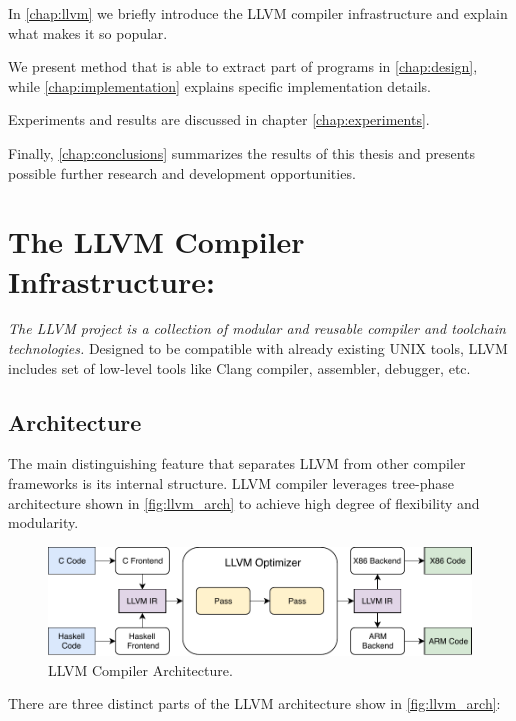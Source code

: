 \documentclass[12pt, twoside]{fithesis2}
\renewcommand{\_}{\leavevmode \kern0.07em\vbox{\hrule width0.4em}}
\begin{document}
In \autoref{chap:llvm} we briefly introduce the LLVM compiler
infrastructure and explain what makes it so popular.

We present method that is able to extract part of programs in
\autoref{chap:design}, while \autoref{chap:implementation} explains specific
implementation details.

Experiments and results are discussed in chapter
\autoref{chap:experiments}.

Finally, \autoref{chap:conclusions} summarizes the results of this thesis and
presents possible further research and development opportunities.


\chapter{The LLVM Compiler Infrastructure:}
\label{chap:llvm}

\emph{The LLVM project is a collection of modular and reusable compiler and
toolchain technologies.} \cite{llvm}
Designed to be compatible with already existing UNIX tools, LLVM includes
set of low-level tools like Clang compiler, assembler, debugger, etc. \cite{asoa}


\section{Architecture}
\label{sec:llvm-arch}

The main distinguishing feature that separates LLVM from other compiler
frameworks is its internal structure. LLVM compiler leverages tree-phase
architecture shown in \autoref{fig:llvm_arch} to achieve high degree of
flexibility and modularity.

\begin{figure}[ht]
    \centering
    \includegraphics[]{images/llvm/llvm_arch.pdf}
    \caption{
    LLVM Compiler Architecture.\cite{asoa}
    }
    \label{fig:llvm_arch}
\end{figure}

There are three distinct parts of the LLVM architecture show in
\autoref{fig:llvm_arch}:
\end{document}
